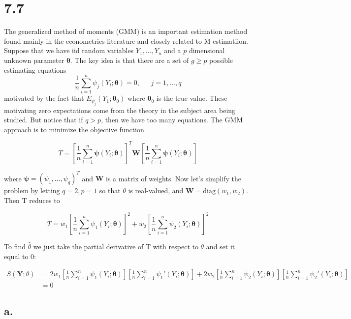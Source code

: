 \documentclass[
  letterpaper,
  DIV=11,
  numbers=noendperiod]{scrreprt}
\begin{document}
\hypertarget{section-47}{%
\section{7.7}\label{section-47}}

The generalized method of moments (GMM) is an important estimation
method found mainly in the econometrics literature and closely related
to M-estimatiion. Suppose that we have iid random variables
\(Y_1, \dots, Y_n\) and a \(p\) dimensional unknown parameter
\(\boldsymbol \theta\). The key idea is that there are a set of
\(g \geq p\) possible estimating equations
\[\frac 1 n \sum_{i=1}^n \psi_j (Y_i; \boldsymbol \theta) = 0, ~~~~~~~j=1, \dots, q\]
motivated by the fact that \(E_{\psi_j}(Y_1; \boldsymbol \theta_0)\)
where \(\boldsymbol \theta_0\) is the true value. These motivating zero
expectations come from the theory in the subject area being studied. But
notice that if \(q > p\), then we have too many equations. The GMM
approach is to minimize the objective function

\[T= \left[\frac 1 n \sum_{i=1}^n \boldsymbol \psi (Y_i; \boldsymbol \theta)\right]^T \mathbf W \left[\frac 1 n \sum_{i=1}^n \boldsymbol \psi (Y_i; \boldsymbol \theta)\right]\]

where \(\boldsymbol \psi = (\psi_1, \dots, \psi_q)^T\) and \(\mathbf W\)
is a matrix of weights. Now let's simplify the problem by letting
\(q=2, p=1\) so that \(\theta\) is real-valued, and
\(\mathbf W = \text{diag}(w_1,w_2)\). Then T reduces to

\[T= w_1\left[\frac 1 n \sum_{i=1}^n \psi_1 (Y_i; \boldsymbol \theta)\right]^2 +w_2\left[\frac 1 n \sum_{i=1}^n \psi_2 (Y_i; \boldsymbol \theta)\right]^2\]

To find \(\hat \theta\) we just take the partial derivative of T with
respect to \(\theta\) and set it equal to 0:

\[\begin{aligned}
S(\mathbf Y; \theta) &= 2w_1\left[\frac 1 n \sum_{i=1}^n \psi_1 (Y_i; \boldsymbol \theta)\right]\left[\frac 1 n \sum_{i=1}^n \psi_1 '(Y_i; \boldsymbol \theta)\right] +2w_2\left[\frac 1 n \sum_{i=1}^n \psi_2 (Y_i; \boldsymbol \theta)\right]\left[\frac 1 n \sum_{i=1}^n \psi_2 '(Y_i; \boldsymbol \theta)\right] \\
&= 0
\end{aligned}\]

\hypertarget{a.-8}{%
\subsection{a.}\label{a.-8}}
\end{document}
